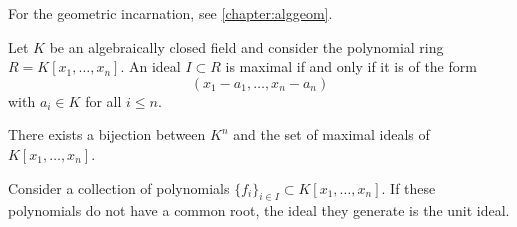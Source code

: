     For the geometric incarnation, see \cref{chapter:alggeom}.

    \begin{theorem}
        Let $K$ be an algebraically closed field and consider the polynomial ring $R=K[x_1,\ldots,x_n]$. An ideal $I\subset R$ is maximal if and only if it is of the form \[(x_1-a_1,\ldots,x_n-a_n)\] with $a_i\in K$ for all $i\leq n$.
    \end{theorem}
    \begin{result}
        There exists a bijection between $K^n$ and the set of maximal ideals of $K[x_1,\ldots,x_n]$.
    \end{result}
    \begin{result}
        Consider a collection of polynomials $\{f_i\}_{i\in I}\subset K[x_1,\ldots,x_n]$. If these polynomials do not have a common root, the ideal they generate is the unit ideal.
    \end{result}

